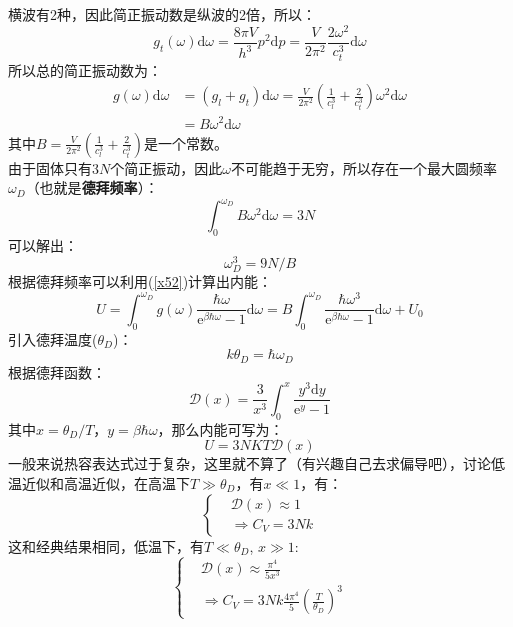 \documentclass[12pt]{article}
\begin{document}
横波有2种，因此简正振动数是纵波的2倍，所以：
\begin{equation}
	g_t(\omega)\mathrm{d}\omega=\frac{8\pi V}{h^3}p^2\mathrm{d}p=\frac{V}{2\pi^2}\frac{2\omega^2}{c_t^3}\mathrm{d}\omega
\end{equation}
所以总的简正振动数为：
\begin{equation}
	\begin{split}
	g(\omega)\mathrm{d}\omega&=(g_l+g_t)\mathrm{d}\omega=\frac{V}{2\pi^2}(\frac{1}{c_l^3}+\frac{2}{c_t^3})\omega^2\mathrm{d}\omega
	\\
	&=B\omega^2\mathrm{d}\omega
\end{split}
\end{equation}
其中$B=\frac{V}{2\pi^2}(\frac{1}{c_l^3}+\frac{2}{c_t^3})$是一个常数。\\
由于固体只有$3N$个简正振动，因此$\omega$不可能趋于无穷，所以存在一个最大圆频率$\omega_D$（也就是\textbf{德拜频率}）：
\begin{equation}
	\int_{0}^{\omega_D} B\omega^2\mathrm{d}\omega=3N
\end{equation}
可以解出：
\begin{equation}
	\omega_D^3=9N/B
\end{equation}
根据德拜频率可以利用(\ref{x52})计算出内能：
\begin{equation}
	U=\int_{0}^{\omega_D}g(\omega)\frac{\hbar\omega}{\mathrm{e}^{\beta\hbar\omega}-1}\mathrm{d}\omega=B\int_{0}^{\omega_D}\frac{\hbar\omega^3}{\mathrm{e}^{\beta\hbar\omega}-1}\mathrm{d}\omega+U_0
\end{equation}
引入德拜温度($\theta_D$)：
\begin{equation}
	k\theta_D=\hbar\omega_D
\end{equation}
根据德拜函数：
\begin{equation}
	\mathscr{D}(x)=\frac{3}{x^3}\int_{0}^{x}\frac{y^3\mathrm{d}y}{\mathrm{e}^y-1}
\end{equation}
其中$x=\theta_D/T$，$y=\beta\hbar\omega$，那么内能可写为：
\begin{equation}
	U=3NKT\mathscr{D}(x)
\end{equation}
一般来说热容表达式过于复杂，这里就不算了（有兴趣自己去求偏导吧），讨论低温近似和高温近似，在高温下$T\gg\theta_D$，有$x\ll1$，有：
\begin{equation}
	\left\{
	\begin{split}
		&\mathscr{D}(x)\approx 1\\
		&\Rightarrow C_V=3Nk
	\end{split}\right.
\end{equation}
这和经典结果相同，低温下，有$T\ll \theta_D$, $x\gg1$:
\begin{equation}
	\left \{
	\begin{split}
		&\mathscr{D}(x)\approx \frac{\pi^4}{5x^3}\\
		&\Rightarrow C_V=3Nk\frac{4\pi^4}{5}(\frac{T}{\theta_D})^3
	\end{split}\right.
\end{equation}
\end{document}

